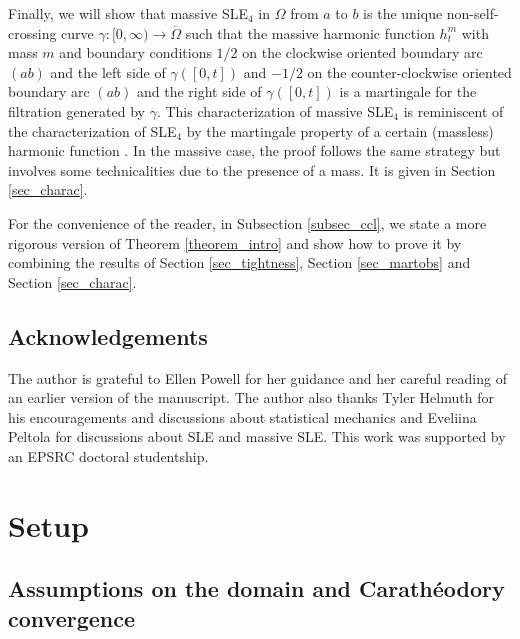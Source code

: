 \documentclass{article}
\theoremstyle{definition}
\theoremstyle{remark}
\theoremstyle{remark}
\begin{document}
Finally, we will show that massive SLE$_4$ in $\Omega$ from $a$ to $b$ is the unique non-self-crossing curve $\gamma:[0,\infty) \to \overline{\Omega}$ such that the massive harmonic function $h^m_t$ with mass $m$ and boundary conditions $1/2$ on the clockwise oriented boundary arc $(ab)$ and the left side of $\gamma([0,t])$ and $-1/2$ on the counter-clockwise oriented boundary arc $(ab)$ and the right side of $\gamma([0,t])$ is a martingale for the filtration generated by $\gamma$. This characterization of massive SLE$_4$ is reminiscent of the characterization of SLE$_4$ by the martingale property of a certain (massless) harmonic function \cite{Dub_SLE, IG_1}. In the massive case, the proof follows the same strategy but involves some technicalities due to the presence of a mass. It is given in Section \ref{sec_charac}.

For the convenience of the reader, in Subsection \ref{subsec_ccl}, we state a more rigorous version of Theorem \ref{theorem_intro} and show how to prove it by combining the results of Section \ref{sec_tightness}, Section \ref{sec_martobs} and Section \ref{sec_charac}. 

\subsection*{Acknowledgements} The author is grateful to Ellen Powell for her guidance and her careful reading of an earlier version of the manuscript. The author also thanks Tyler Helmuth for his encouragements and discussions about statistical mechanics and Eveliina Peltola for discussions about SLE and massive SLE. This work was supported by an EPSRC
doctoral studentship.

\section{Setup} \label{sec_setup}

\subsection{Assumptions on the domain and Carath\'eodory convergence} \label{subsec:domain}
\end{document}

